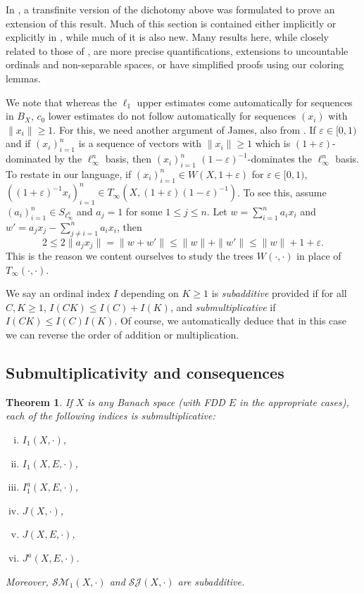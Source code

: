 \documentclass[12pt]{amsart}
\newtheorem{theorem}{Theorem}[section]
\theoremstyle{definition}
\newcommand{\ssm}{\mathcal{SM}}
\newcommand{\ssj}{\mathcal{SJ}}
\begin{document}
In \cite{JO}, a transfinite version of the dichotomy above was formulated to prove an extension of this result.  Much of this section is contained either implicitly or explicitly in \cite{JO}, while much of it is also new.  Many results here, while closely related to those of \cite{JO}, are more precise quantifications, extensions to uncountable ordinals and non-separable spaces, or have simplified proofs using our coloring lemmas.  


We note that whereas the $\ell_1$ upper estimates come automatically for sequences in $B_X$, $c_0$ lower estimates do not follow automatically for sequences $(x_i)$ with $\|x_i\|\geqslant 1$.  For this, we need another argument of James, also from \cite{James}.  If $\varepsilon\in [0,1)$ and if $(x_i)_{i=1}^n$ is a sequence of vectors with $\|x_i\|\geqslant 1$ which is $(1+\varepsilon)$-dominated by the $\ell_\infty^n$ basis, then $(x_i)_{i=1}^n$ $(1-\varepsilon)^{-1}$-dominates the $\ell_\infty^n$ basis.  To restate in our language, if $(x_i)_{i=1}^n\in W(X, 1+\varepsilon)$ for $\varepsilon\in [0,1)$, $((1+\varepsilon)^{-1} x_i)_{i=1}^n\in T_\infty(X, (1+\varepsilon)(1-\varepsilon)^{-1})$.  To see this, assume $(a_i)_{i=1}^n\in S_{\ell_\infty^n}$ and $a_j=1$ for some $1\leqslant j\leqslant n$. Let $w=\sum_{i=1}^n a_ix_i$ and $w'=a_jx_j-\sum_{j\neq i=1}^n a_i x_i$, then $$2\leqslant 2\|a_jx_j\| = \|w+w'\|\leqslant \|w\|+\|w'\|\leqslant \|w\|+1+\varepsilon.$$  This is the reason we content ourselves to study the trees $W(\cdot, \cdot)$ in place of $T_\infty(\cdot, \cdot)$.  

We say an ordinal index $I$ depending on $K\geqslant 1$ is \emph{subadditive} provided if for all $C, K\geqslant 1$, $I(CK)\leqslant I(C)+I(K)$, and \emph{submultiplicative} if $I(CK)\leqslant I(C)I(K)$.  Of course, we automatically deduce that in this case we can reverse the order of addition or multiplication.  

\subsection{Submultiplicativity and consequences}

\begin{theorem}

If $X$ is any Banach space (with FDD $E$ in the appropriate cases), each of the following indices is submultiplicative: \begin{enumerate}[(i)]\item $I_1(X, \cdot)$, \item $I_1(X, E, \cdot)$, \item $I_1^a(X, E, \cdot)$, \item $J(X, \cdot)$, \item $J(X, E, \cdot)$, \item $J^a(X, E, \cdot)$. \end{enumerate}

Moreover, $ \ssm_1(X, \cdot)$ and $\ssj(X, \cdot)$ are subadditive. 

\label{submultiplicative} 

\end{theorem}
\end{document}
